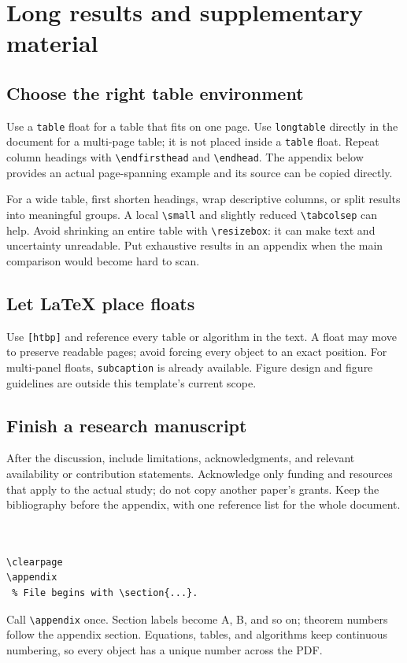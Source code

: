 \documentclass[11pt]{article}
\begin{document}
\clearpage
\section{Long results and supplementary material}
\subsection{Choose the right table environment}
Use a \texttt{table} float for a table that fits on one page. Use
\texttt{longtable} directly in the document for a multi-page table; it is not
placed inside a \texttt{table} float. Repeat column headings with
\verb|\endfirsthead| and \verb|\endhead|. The appendix below provides an actual
page-spanning example and its source can be copied directly.

For a wide table, first shorten headings, wrap descriptive columns, or split
results into meaningful groups. A local \verb|\small| and slightly reduced
\verb|\tabcolsep| can help. Avoid shrinking an entire table with
\verb|\resizebox|: it can make text and uncertainty unreadable. Put exhaustive
results in an appendix when the main comparison would become hard to scan.

\subsection{Let LaTeX place floats}
Use \verb|[htbp]| and reference every table or algorithm in the text. A float may
move to preserve readable pages; avoid forcing every object to an exact position.
For multi-panel floats, \texttt{subcaption} is already available. Figure design
and figure guidelines are outside this template's current scope.

\subsection{Finish a research manuscript}
After the discussion, include limitations, acknowledgments, and relevant
availability or contribution statements. Acknowledge only funding and resources
that apply to the actual study; do not copy another paper's grants. Keep the
bibliography before the appendix, with one reference list for the whole document.
\begin{lstlisting}


\clearpage
\appendix
 % File begins with \section{...}.
\end{lstlisting}
Call \verb|\appendix| once. Section labels become A, B, and so on; theorem
numbers follow the appendix section. Equations, tables, and algorithms keep
continuous numbering, so every object has a unique number across the PDF.
\end{document}

